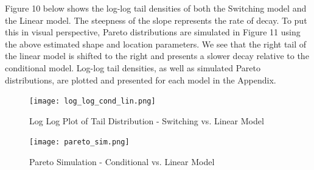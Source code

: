 \documentclass[11pt,a4paper,oldfontcommands]{memoir}
\begin{document}
{Figure 10 below shows the log-log tail densities of both the Switching model and the Linear model. The steepness of the slope represents the rate of decay. To put this in visual perspective, Pareto distributions are simulated in Figure 11 using the above estimated shape and location parameters. We see that the right tail of the linear model is shifted to the right and presents a slower decay relative to the conditional model. Log-log tail densities, as well as simulated Pareto distributions, are plotted and presented for each model in the Appendix. 


\begin{figure}[H]
\caption{Log Log Plot of Tail Distribution - Switching vs. Linear Model}
\texttt{[image: log\_log\_cond\_lin.png]} 
\centering
\label{}
\end{figure}

\begin{figure}[H]
\caption{Pareto Simulation - Conditional vs. Linear Model}
\texttt{[image: pareto\_sim.png]} 
\centering
\label{}
\end{figure}




}
\end{document}

